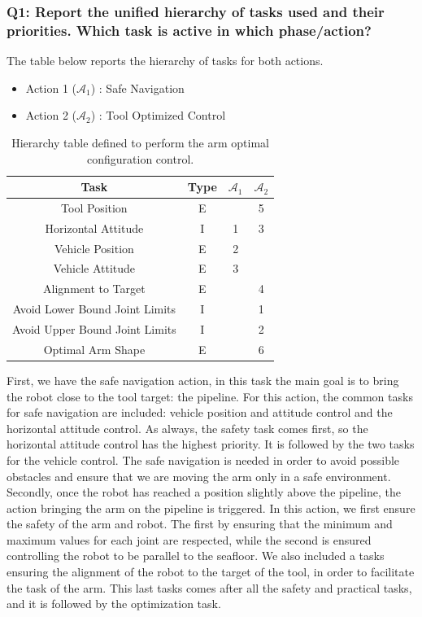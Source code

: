 \documentclass{article}
\begin{document}
\subsubsection{Q1: Report the unified hierarchy of tasks used and their priorities. Which task is active in which phase/action?}
The table below reports the hierarchy of tasks for both actions. 
\begin{table}[htb]
	\caption{Hierarchy table defined to perform the arm optimal configuration control.}
	\begin{itemize}
		\item Action 1 ($\mathcal{A}_{1}$) : Safe Navigation
		\item Action 2 ($\mathcal{A}_{2}$) : Tool Optimized Control
	\end{itemize}
	\label{tb8:ex5.2.1HierarchyTable}
	\begin{center}
		\footnotesize
		\begin{tabular}{cccc}
			\toprule
			Task & Type & $\mathcal{A}_{1}$ & $\mathcal{A}_{2}$ \\			
			\midrule
			Tool Position                   & E &    &	5	\\
			\hdashline
			Horizontal Attitude             & I & 1  &	3	\\
			\hdashline
			Vehicle Position        		& E & 2  &	 	\\
			\hdashline
			Vehicle Attitude        		& E & 3  &	 	\\
			\hdashline
			Alignment to Target           	& E &    &	4	\\
			\hdashline
			Avoid Lower Bound Joint Limits  & I &    &	1	\\
			\hdashline
			Avoid Upper Bound Joint Limits  & I &    &	2	\\
			\hdashline
			Optimal Arm Shape				& E &    &	6	\\
			\bottomrule
		\end{tabular}
	\end{center}
\end{table}
First, we have the safe navigation action, in this task the main goal is to bring the robot close to the tool target: the pipeline. For this action, the common tasks for safe navigation are included: vehicle position and attitude control and the horizontal attitude control. As always, the safety task comes first, so the horizontal attitude control has the highest priority. It is followed by the two tasks for the vehicle control. The safe navigation is needed in order to avoid possible obstacles and ensure that we are moving the arm only in a safe environment. 
Secondly, once the robot has reached a position slightly above the pipeline, the action bringing the arm on the pipeline is triggered. In this action, we first ensure the safety of the arm and robot. The first by ensuring that the minimum and maximum values for each joint are respected, while the second is ensured controlling the robot to be parallel to the seafloor. We also included a tasks ensuring the alignment of the robot to the target of the tool, in order to facilitate the task of the arm. This last tasks comes after all the safety and practical tasks, and it is followed by the optimization task. 
\end{document}
